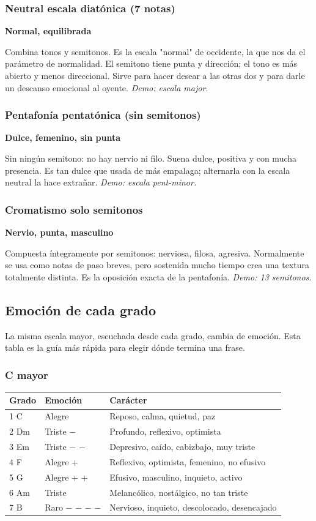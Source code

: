 \documentclass[11pt,a4paper]{article}
\begin{document}
\subsubsection{Neutral \textemdash{} escala diatónica (7 notas)}
\textbf{Normal, equilibrada}
\par Combina tonos y semitonos. Es la escala "normal" de occidente, la que nos da el parámetro de normalidad. El semitono tiene punta y dirección; el tono es más abierto y menos direccional. Sirve para hacer desear a las otras dos y para darle un descanso emocional al oyente.
\emph{Demo: escala major.}
\subsubsection{Pentafonía \textemdash{} pentatónica (sin semitonos)}
\textbf{Dulce, femenino, sin punta}
\par Sin ningún semitono: no hay nervio ni filo. Suena dulce, positiva y con mucha presencia. Es tan dulce que usada de más empalaga; alternarla con la escala neutral la hace extrañar.
\emph{Demo: escala pent-minor.}
\subsubsection{Cromatismo \textemdash{} solo semitonos}
\textbf{Nervio, punta, masculino}
\par Compuesta íntegramente por semitonos: nerviosa, filosa, agresiva. Normalmente se usa como notas de paso breves, pero sostenida mucho tiempo crea una textura totalmente distinta. Es la oposición exacta de la pentafonía.
\emph{Demo: 13 semitonos.}
\subsection{Emoci\'on de cada grado}
La misma escala mayor, escuchada desde cada grado, cambia de emoci\'on. Esta tabla es la gu\'ia m\'as r\'apida para elegir d\'onde termina una frase.
\subsubsection{C mayor}
\begin{longtable}{p{2.5cm}p{2.7cm}p{9cm}}
\textbf{Grado} & \textbf{Emoci\'on} & \textbf{Car\'acter} \\ \hline
1 \textemdash{} C & Alegre & Reposo, calma, quietud, paz \\
2 \textemdash{} Dm & Triste \ensuremath{-} & Profundo, reflexivo, optimista \\
3 \textemdash{} Em & Triste \ensuremath{-} \ensuremath{-} & Depresivo, caído, cabizbajo, muy triste \\
4 \textemdash{} F & Alegre + & Reflexivo, optimista, femenino, no efusivo \\
5 \textemdash{} G & Alegre + + & Efusivo, masculino, inquieto, activo \\
6 \textemdash{} Am & Triste & Melancólico, nostálgico, no tan triste \\
7 \textemdash{} B\textdegree{} & Raro \ensuremath{-} \ensuremath{-} \ensuremath{-} \ensuremath{-} & Nervioso, inquieto, descolocado, desencajado \\
\end{longtable}
\end{document}
